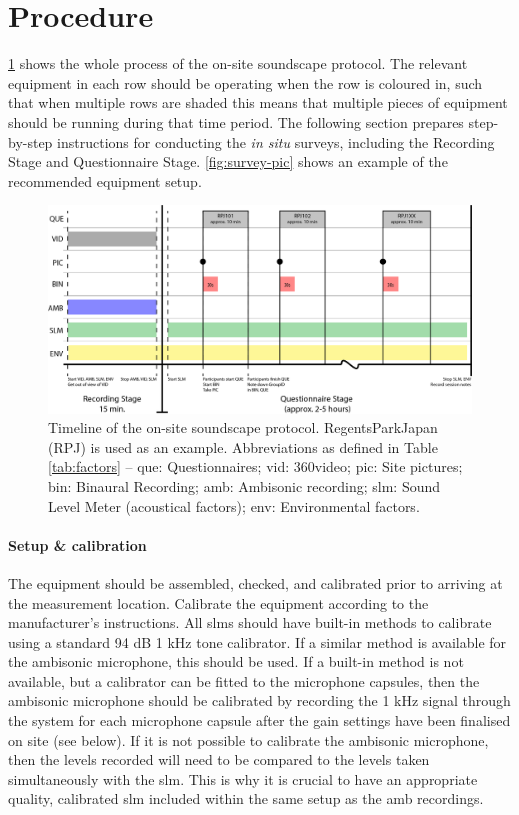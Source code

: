 \section{Procedure}
 \label{sec:proc}

 \cref{fig:timeline} shows the whole process of the on-site soundscape protocol. The relevant equipment in each row should be operating when the row is coloured in, such that when multiple rows are shaded this means that multiple pieces of equipment should be running during that time period. The following section prepares step-by-step instructions for conducting the \textit{in situ} surveys, including the Recording Stage and Questionnaire Stage. \cref{fig:survey-pic} shows an example of the recommended equipment setup.

 \begin{figure}[h]
   \centering
   \includegraphics[width=\textwidth]{Figures/Survey-Diagram_V2}
   \caption{Timeline of the on-site soundscape protocol. RegentsParkJapan (RPJ) is used as an example. Abbreviations as defined in Table \ref{tab:factors} -- \gls{que}: Questionnaires; \gls{vid}: 360\degree video; \gls{pic}: Site pictures; \gls{bin}: Binaural Recording; \gls{amb}: Ambisonic recording; \gls{slm}: Sound Level Meter (acoustical factors); \gls{env}: Environmental factors. \label{fig:timeline}}
 \end{figure}

 \paragraph*{Setup \& calibration} The equipment should be assembled, checked, and calibrated prior to arriving at the measurement location. Calibrate the equipment according to the manufacturer's instructions. All \gls{slm}s should have built-in methods to calibrate using a standard 94 dB 1 kHz tone calibrator. If a similar method is available for the ambisonic microphone, this should be used. If a built-in method is not available, but a calibrator can be fitted to the microphone capsules, then the ambisonic microphone should be calibrated by recording the 1 kHz signal through the system for each microphone capsule after the gain settings have been finalised on site (see below). If it is not possible to calibrate the ambisonic microphone, then the levels recorded will need to be compared to the levels taken simultaneously with the \gls{slm}. This is why it is crucial to have an appropriate quality, calibrated \gls{slm} included within the same setup as the \gls{amb} recordings.

